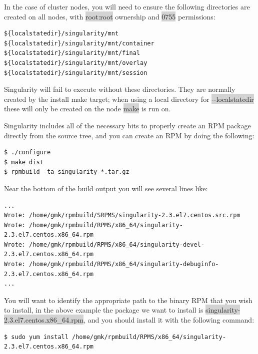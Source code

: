 \documentclass[a4paper]{article}
\newcounter{subsubsubsection}[subsubsection]
\begin{document}
In the case of cluster nodes, you will need to ensure the following directories are created on all nodes, with \colorbox{lightgray}{root:root} ownership and \colorbox{lightgray}{0755} permissions:

\begin{lstlisting}[frame=single]
${localstatedir}/singularity/mnt
${localstatedir}/singularity/mnt/container
${localstatedir}/singularity/mnt/final
${localstatedir}/singularity/mnt/overlay
${localstatedir}/singularity/mnt/session
\end{lstlisting}

Singularity will fail to execute without these directories. They are normally created by the install make target; when using a local directory for  \colorbox{lightgray}{-{}-localstatedir} these will only be created on the node  \colorbox{lightgray}{make} is run on.




Singularity includes all of the necessary bits to properly create an RPM package directly from the source tree, and you can create an RPM by doing the following:


\begin{lstlisting}[frame=single]
$ ./configure
$ make dist
$ rpmbuild -ta singularity-*.tar.gz
\end{lstlisting}

Near the bottom of the build output you will see several lines like:


\begin{lstlisting}[frame=single]
...
Wrote: /home/gmk/rpmbuild/SRPMS/singularity-2.3.el7.centos.src.rpm
Wrote: /home/gmk/rpmbuild/RPMS/x86_64/singularity-2.3.el7.centos.x86_64.rpm
Wrote: /home/gmk/rpmbuild/RPMS/x86_64/singularity-devel-2.3.el7.centos.x86_64.rpm
Wrote: /home/gmk/rpmbuild/RPMS/x86_64/singularity-debuginfo-2.3.el7.centos.x86_64.rpm
...
\end{lstlisting}

You will want to identify the appropriate path to the binary RPM that you wish to install, in the above example the package we want to install is \colorbox{lightgray}{singularity-2.3.el7.centos.x86\_64.rpm}, and you should install it with the following command: 
\begin{lstlisting}[frame=single]
$ sudo yum install /home/gmk/rpmbuild/RPMS/x86_64/singularity-2.3.el7.centos.x86_64.rpm
\end{lstlisting}
\end{document}
